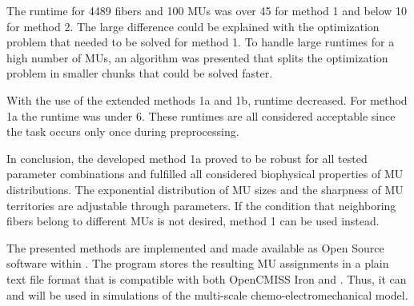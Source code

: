 The runtime for \num{4489} fibers and 100 MUs was over \SI{45}{\min} for method 1 and below \SI{10}{\sec} for method 2. The large difference could be explained with the optimization problem that needed to be solved for method 1. To handle large runtimes for a high number of MUs, an algorithm was presented that splits the optimization problem in smaller chunks that could be solved faster.

With the use of the extended methods 1a and 1b, runtime decreased. For method 1a the runtime was under \SI{6}{\min}. These runtimes are all considered acceptable since the task occurs only once during preprocessing. 

In conclusion, the developed method 1a proved to be robust for all tested parameter combinations and fulfilled all considered biophysical properties of MU distributions. The exponential distribution of MU sizes and the sharpness of MU territories are adjustable through parameters. If the condition that neighboring fibers belong to different MUs is not desired, method 1 can be used instead.

The presented methods are implemented and made available as Open Source software within \opendihu{}.
The program stores the resulting MU assignments in a plain text file format that is compatible with both OpenCMISS Iron and \opendihu{}. Thus, it can and will be used in simulations of the multi-scale chemo-electromechanical model.
